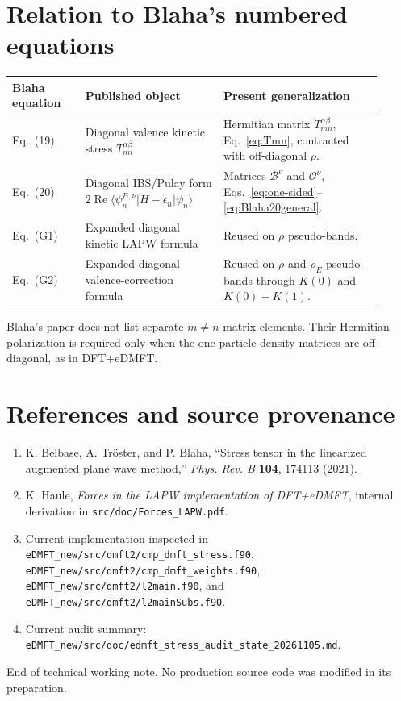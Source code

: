 \documentclass[11pt]{article}
\numberwithin{equation}{section}
\newcommand{\Ree}{\operatorname{Re}}
\newcommand{\filepath}[1]{\nolinkurl{#1}}
\begin{document}
\section{Relation to Blaha's numbered equations}

\begin{longtable}{p{0.18\linewidth}p{0.34\linewidth}p{0.39\linewidth}}
\toprule
Blaha equation & Published object & Present generalization\\
\midrule
Eq.~(19) & Diagonal valence kinetic stress $T_{nn}^{\alpha\beta}$ & Hermitian matrix $T_{mn}^{\alpha\beta}$, Eq.~\eqref{eq:Tmn}, contracted with off-diagonal $\rho$.\\
Eq.~(20) & Diagonal IBS/Pulay form $2\Ree\langle\psi_n^{B,\nu}|H-\epsilon_n|\psi_n\rangle$ & Matrices $\mathcal B^\nu$ and $\mathcal O^\nu$, Eqs.~\eqref{eq:one-sided}--\eqref{eq:Blaha20general}.\\
Eq.~(G1) & Expanded diagonal kinetic LAPW formula & Reused on $\rho$ pseudo-bands.\\
Eq.~(G2) & Expanded diagonal valence-correction formula & Reused on $\rho$ and $\rho_E$ pseudo-bands through $K(0)$ and $K(0)-K(1)$.\\
\bottomrule
\end{longtable}

Blaha's paper does not list separate $m\ne n$ matrix elements.  Their
Hermitian polarization is required only when the one-particle density matrices
are off-diagonal, as in DFT+eDMFT.

\section{References and source provenance}

\sloppy
\begin{enumerate}
\item K. Belbase, A. Tr\"oster, and P. Blaha, ``Stress tensor in the linearized
      augmented plane wave method,'' \emph{Phys. Rev. B} \textbf{104}, 174113
      (2021).
\item K. Haule, \emph{Forces in the LAPW implementation of DFT+eDMFT},
      internal derivation in \filepath{src/doc/Forces_LAPW.pdf}.
\item Current implementation inspected in
      \filepath{eDMFT_new/src/dmft2/cmp_dmft_stress.f90},
      \filepath{eDMFT_new/src/dmft2/cmp_dmft_weights.f90},
      \filepath{eDMFT_new/src/dmft2/l2main.f90}, and
      \filepath{eDMFT_new/src/dmft2/l2mainSubs.f90}.
\item Current audit summary:
      \filepath{eDMFT_new/src/doc/edmft_stress_audit_state_20261105.md}.
\end{enumerate}
\fussy

\vfill
\begin{center}
\small\color{bluegray}
End of technical working note.  No production source code was modified in its preparation.
\end{center}
\end{document}
